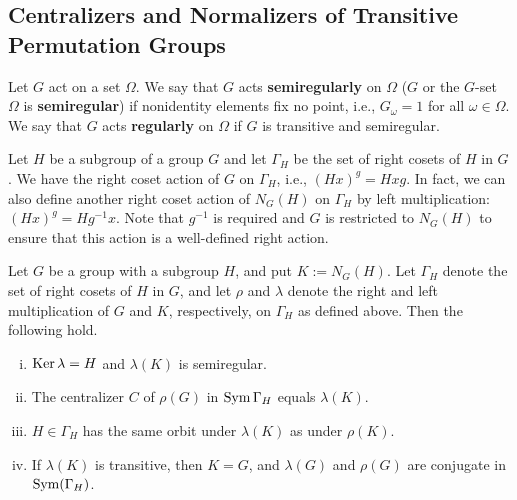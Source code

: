 \subsection{Centralizers and Normalizers of Transitive Permutation Groups}
\begin{definition}
	Let $G$ act on a set $\Omega$. We say that $G$ acts \textbf{semiregularly} on $\Omega$ ($G$ or the $G$-set $\Omega$ is \textbf{semiregular}) if nonidentity elements fix no point, i.e., $G_\omega = 1$ for all $\omega\in\Omega$. We say that $G$ acts \textbf{regularly} on $\Omega$ if $G$ is transitive and semiregular.
\end{definition}
Let $H$ be a subgroup of a group $G$ and let $\Gamma_H$ be the set of right cosets of $H$ in $G$. We have the right coset action of $G$ on $\Gamma_H$, i.e., $(Hx)^g = Hxg$. In fact, we can also define another right coset action of $N_G(H)$ on $\Gamma_H$ by left multiplication: $(Hx)^g = Hg^{-1}x$. Note that $g^{-1}$ is required and $G$ is restricted to $N_G(H)$ to ensure that this action is a well-defined right action.
\begin{lemma} \label{lemma-left-right-mult}
	Let $G$ be a group with a subgroup $H$, and put $K := N_G(H)$. Let $\Gamma_H$ denote the set of right cosets of $H$ in $G$, and let $\rho$ and $\lambda$ denote the right and left multiplication of $G$ and $K$, respectively, on $\Gamma_H$ as defined above. Then the following hold.
\begin{enumerate}[(i)]
\item $\operatorname{Ker} \lambda = H$ and $\lambda(K)$ is semiregular.
\item The centralizer $C$ of $\rho(G)$ in $\operatorname{Sym}\Gamma_H$ equals $\lambda(K)$.
\item $H \in \Gamma_H$ has the same orbit under $\lambda(K)$ as under $\rho(K)$.
\item If $\lambda(K)$ is transitive, then $K = G$, and $\lambda(G)$ and $\rho(G)$ are conjugate in $\operatorname{Sym}(\Gamma_H)$.
\end{enumerate}
\end{lemma}
